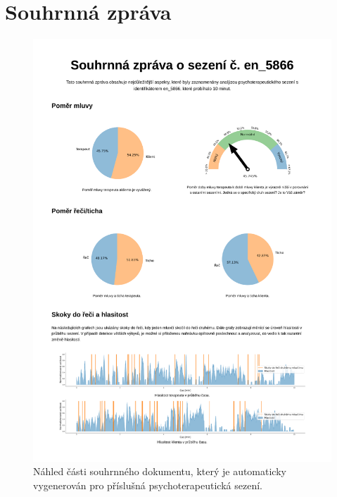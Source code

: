 \chapter{Souhrnná zpráva}
\label{chap:Output_preview}
\begin{figure}[ht]
  \centering
  \includegraphics[height=0.64\textheight]{prilohy/output.pdf}
  \caption{Náhled části souhrnného dokumentu, který je automaticky vygenerován pro příslušná psychoterapeutická sezení.}
  \label{fig:Preview}
\end{figure}